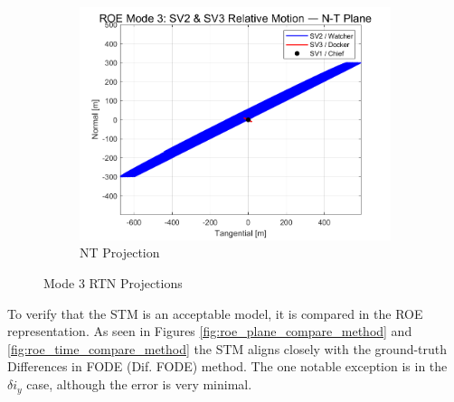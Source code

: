 \begin{figure}[H]
\begin{subfigure}[b]{0.32\linewidth}
        \includegraphics[width=\linewidth]{sim/figures/PS5/mode_3_RTN.png_NT.png}
        \caption{NT Projection}
        \label{fig:mode_3_nt}
    \end{subfigure}
    \caption{Mode 3 RTN Projections}
    \label{fig:mode_3_rtn}
\end{figure}

To verify that the STM is an acceptable model, it is compared in the ROE representation. As seen in Figures \ref{fig:roe_plane_compare_method} and \ref{fig:roe_time_compare_method} the STM aligns closely with the ground-truth Differences in FODE (Dif. FODE) method. The one notable exception is in the $\delta i_y$ case, although the error is very minimal.

